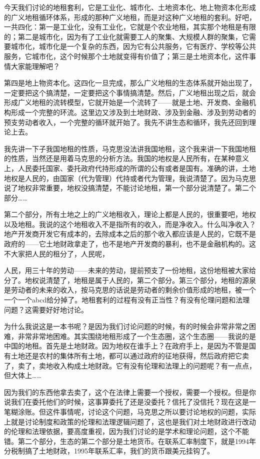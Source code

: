 \documentclass[UTF8, 12pt, a4paper]{ctexrep}
\begin{document}
今天我们讨论的地租套利，它是工业化、城市化、土地资本化、地上物资本化形成的广义地租循环体系，形成的那种广义地租，而是对这种广义地租的套利。好吧，一共四化：第一是工业化，没有工业化，它就是个农业地租，其实那个地租是有限的；第二是城市化，因为有了工业化就需要工人的聚集、大规模人群的聚集，它需要城市化，城市化是一个复杂的东西，因为它有公共服务，它有医疗、学校等公共服务，它城市化，这个时候那个土地就变得有价值了；第三是土地资本化，这件事情大家能理解吧？

第四是地上物资本化。这四化一旦完成，那么广义地租的生态体系就开始出现了，一定要把这个搞清楚，一定要把这个事情搞清楚。然后，广义地租出现之后，就会形成广义地租的流转模型，它就开始是一个流转了——就是土地、开发商、金融机构形成一个完整的环流。这里边又涉及到土地财政、涉及到金融、涉及到劳动者的预支劳动者收入，一个完整的循环就开始了。我先不讲生态和循环，我先还回到理论上去。

我先讲一下子我国地租的性质，马克思没法讲我国地租，这个我来讲一下我国地租的性质，当然还是用着马克思的分析方法。我国的地权是人民所有，在某种意义上，人民委托国家、委托政府代持形成的所谓的公有或者是国有。准确的讲，土地地权是人民的，由国家（代为管理）代持或者代为管理，我说清楚了。因为马克思说了地权非常重要，地权没搞清楚，不能讨论地租，第一个部分说清楚了。第二个部分……

第二个部分，所有土地之上的广义地租收入，理论上都是人民的，很重要吧，地权以及地租。我说的这个地租收入不是指所有的收入，而是净收入。什么叫净收入？地产开发商开发它有成本的，去除成本之后的那个收入都应该是人民的，它既不是政府的——它土地财政拿走了，也不是地产开发商的暴利，也不是金融机构的。这不大家把人民的租分了，人民呢，

人民，用三十年的劳动——未来的劳动，提前预支了一份地租，这份地租被大家给分了。地权说清楚了，地租是属于人民的，第二个部分。第三个部分，地租的源泉是劳动者的未来的收入，按马克思的话说是劳动者的剩余价值形成的地租，被一个一个一个abcd给分掉了。地租套利的过程有没有正当性？有没有伦理问题和法理问题？这需要好好地讨论。

为什么我说这是一本书呢？是因为我们讨论问题的时候，有的时候会非常非常之困难，非常非常地困难。其实围绕地租形成了一个生态圈，这个生态圈——我说的是中国的地租。首先是土地财政。因为地权在谁手上？在政府手上，是因为不管是国有土地还是农村的集体所有土地，都可以通过政府的征地获得，然后政府把它卖了，卖了，卖地收入构成土地财政。它有没有伦理和法理上的问题呢？有一点点，但大体上……

因为我们的东西他拿去卖了，这个在法律上需要一个授权，需要一个授权。但是你说我们在委托他们的时候，这事算委托了还是没委托？信托了没信托？现在这是一笔糊涂账。但这件事情呢，讨论这个问题，马克思之所以要讨论地权的问题，实际上就是讨论制度和政策的伦理和法理逻辑问题了，这也是我们对土地财政进行改动的伦理和法理依据，要高度重视，因为我们讨论的是学术和理论问题，这个不能错。第二个部分，生态的第二个部分是土地货币。在联系汇率制度下，就是1994年分税制搞了土地财政，1995年联系汇率，我们的货币跟美元挂钩了。
\end{document}
